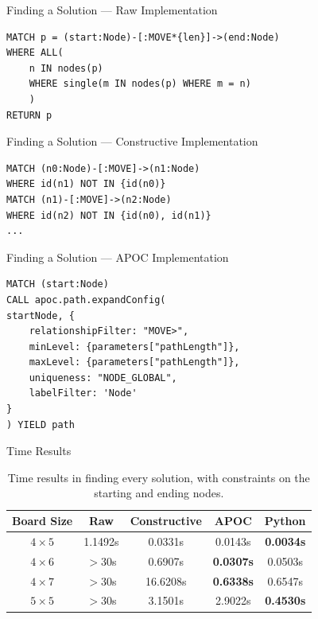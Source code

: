 \documentclass{beamer}
\begin{document}
	\begin{frame}[fragile]{Finding a Solution --- Raw Implementation}
		\begin{lstlisting}[style=cypherStyle]
MATCH p = (start:Node)-[:MOVE*{len}]->(end:Node)
WHERE ALL(
	n IN nodes(p) 
	WHERE single(m IN nodes(p) WHERE m = n)
	)
RETURN p
		\end{lstlisting}
	\end{frame}
	
		\begin{frame}[fragile]{Finding a Solution --- Constructive Implementation}
		\begin{lstlisting}[style=cypherStyle]
MATCH (n0:Node)-[:MOVE]->(n1:Node)
WHERE id(n1) NOT IN {id(n0)}
MATCH (n1)-[:MOVE]->(n2:Node)
WHERE id(n2) NOT IN {id(n0), id(n1)}
...
		\end{lstlisting}
	\end{frame}
	
	\begin{frame}[fragile]{Finding a Solution --- APOC Implementation}
		\begin{lstlisting}[style=cypherStyle]
MATCH (start:Node)
CALL apoc.path.expandConfig(
startNode, {
	relationshipFilter: "MOVE>",
	minLevel: {parameters["pathLength"]},
	maxLevel: {parameters["pathLength"]},
	uniqueness: "NODE_GLOBAL",
	labelFilter: 'Node'
}
) YIELD path
		\end{lstlisting}
	\end{frame}
	
	\begin{frame}{Time Results}
		\begin{table}[ht]
			\centering
			\begin{tabular}{|c|c c c c |}
				\hline
				\textbf{Board Size} & \textbf{Raw} & \textbf{Constructive} & \textbf{APOC} & \textbf{Python} \\ \hline
				\textbf{$4 \times 5$} & 1.1492s & 0.0331s & 0.0143s & \textbf{0.0034s} \\ \hline
				\textbf{$4 \times 6$} & $>$30s & 0.6907s & \textbf{0.0307s} & 0.0503s \\ \hline
				\textbf{$4 \times 7$} & $>$30s & 16.6208s & \textbf{0.6338s} & 0.6547s \\ \hline
				\textbf{$5 \times 5$} & $>$30s & 3.1501s & 2.9022s & \textbf{0.4530s} \\ \hline
			\end{tabular}
			\caption{Time results in finding every solution, with constraints on the starting and ending nodes.}
		\end{table}
	\end{frame}
	
\end{document}
